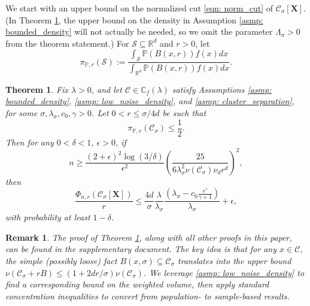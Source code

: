 \documentclass{article}
\newcommand{\Reals}{\mathbb{R}}
\newcommand{\Rd}{\Reals^d}
\newcommand{\1}{\mathbf{1}}
\newcommand{\Xbf}{\mathbf{X}}
\newcommand{\Pbb}{\mathbb{P}}
\newcommand{\Cbb}{\mathbb{C}}
\newcommand{\Cset}{\mathcal{C}}
\newcommand{\Csig}{\Cset_{\sigma}}
\theoremstyle{aldenthm}
\newtheorem{theorem}{Theorem}
\theoremstyle{aldenrmrk}
\newtheorem{remark}{Remark}
\begin{document}
We start with an upper bound on the normalized cut \eqref{eqn: norm_cut} of 
$\Cset_\sigma[\Xbf]$. (In Theorem \ref{thm: conductance_upper_bound}, the upper bound on the density in
Assumption \ref{asmp: bounded_density} will not actually be needed, so we omit
the parameter $\Lambda_\sigma>0$ from the theorem statement.) For $\mathcal{S} \subseteq \Reals^d$ and $r > 0$, let
\begin{equation*}
\pi_{\Pbb,r}(\mathcal{S}) := \frac{\int_{\mathcal{S}} \Pbb(B(x,r)) f(x) dx }{\int_{\Rd} \Pbb(B(x,r)) f(x) dx}.
\end{equation*}

\begin{theorem}
\label{thm: conductance_upper_bound}
Fix $\lambda > 0$, and let $\Cset \in \Cbb_f(\lambda)$ satisfy
Assumptions \ref{asmp: bounded_density}, \ref{asmp: low_noise_density},
and \ref{asmp: cluster_separation}, for some 
$\sigma, \lambda_{\sigma}, c_0, \gamma > 0$. Let $0 < r \leq \sigma/4d$ be such that
\begin{equation}
\label{eqn: weighted_cluster_volume}
\pi_{\Pbb,r}(\Csig) \leq \frac{1}{2}.
\end{equation}
 Then for any $0 < \delta < 1$, $\epsilon > 0$, if
\begin{equation}
\label{eqn: conductance_sample_complexity}
n \geq \frac{(2+\epsilon)^2\log(3/\delta)}{\epsilon^2}\left(\frac{25}
  {6 \lambda_{\sigma}^2\nu(\Csig) \nu_d r^d}\right)^2,
\end{equation}
then
\begin{equation}
  \label{eqn: conductance_additive_error_bound}
  \frac{\Phi_{n,r}(\Csig[\mathbf{X}])}{r} \leq \frac{4d}{\sigma}
  \frac{\lambda}{\lambda_{\sigma}} \frac{(\lambda_{\sigma} -
    c_0\frac{r^{\gamma}}{\gamma+1})}{\lambda_{\sigma}} + \epsilon, 
\end{equation}
with probability at least $1-\delta$.
\end{theorem}

\begin{remark}
The proof of Theorem \ref{thm: conductance_upper_bound}, along with all other
proofs in this paper, can be found in the supplementary document. The key 
idea is that for any $x \in \Cset$, the simple (possibly loose) fact
$B(x,\sigma) \subseteq \Csig$ translates into the upper bound $\nu(\Csig + rB) \leq (1 + 2d r /\sigma)\nu(\Csig)$. We leverage \ref{asmp:
  low_noise_density} to find a corresponding bound on the weighted volume,
then apply standard concentration inequalities to convert from population-
to sample-based results.  
\end{remark}
\end{document}
